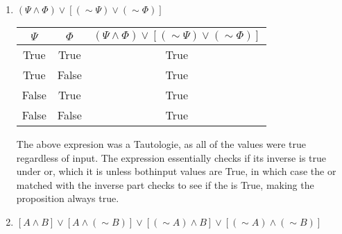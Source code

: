 \documentclass{letter}
\begin{document}
\begin{description}
\begin{enumerate}
\begin{enumerate}
                                   
				\item $(\Psi \wedge \Phi)\vee \left[(\sim \Psi)\vee(\sim \Phi)\right]$ \\ 
                                \begin{center}
                                  \begin{tabular}{||c|c|c||}
                                    \hline
                                    $\Psi$ & $\Phi$ & $(\Psi \wedge \Phi)\vee \left[(\sim \Psi)\vee(\sim \Phi)\right]$ \\ \hline
                                    True & True & True \\ \hline
                                    True & False & True \\ \hline
                                    False & True & True \\ \hline
                                    False & False & True \\ \hline
                                    \end{tabular}
                                    \end{center}
The above expresion was a Tautologie, as all of the values were true regardless of input. The expression essentially checks if its inverse is true under or, which it is unless bothinput values are True, in which case the or matched with the inverse part checks to see if the is True, making the proposition always true. \\
				\item $[A\wedge B]\vee [A\wedge (\sim B)] \vee [(\sim A)\wedge B] \vee [(\sim A)\wedge (\sim B)]$ \\ 
                                  


\end{enumerate}
\end{enumerate}
\end{description}
\end{document}
